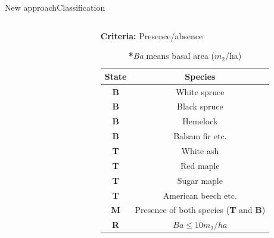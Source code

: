 \documentclass[10pt,aspectratio=149]{beamer}
\begin{document}
\begin{frame}{New approach}{Classification}

\begin{columns}[t]
	\begin{column}[t]{.40\paperwidth}
		\begin{figure}
			\small{}
		\end{figure}
	\end{column}
	\begin{column}[t]{.50\paperwidth}
	\centering \textbf{Criteria:} Presence/absence 
	\begin{table}
		\begin{tabular}{|c|c|}
		\hline
		\textbf{State} & \textbf{Species}            \\ \hline
		\textcolor{Boreal}{\textbf{B}}     & White spruce       \\
		\textcolor{Boreal}{\textbf{B}}     & Black spruce       \\
		\textcolor{Boreal}{\textbf{B}}     & Hemelock         \\
		\textcolor{Boreal}{\textbf{B}}     & Balsam fir etc.        \\ \hline
		\textcolor{Temperate}{\textbf{T}}     & White ash        \\
		\textcolor{Temperate}{\textbf{T}}     & Red maple   \\
		\textcolor{Temperate}{\textbf{T}}     & Sugar maple \\
		\textcolor{Temperate}{\textbf{T}}     & American beech etc.    \\ \hline
		\textcolor{Mixed}{\textbf{M}}     & Presence of both species (\textcolor{Temperate}{\textbf{T}} and \textcolor{Boreal}{\textbf{B}}) \\ \hline
		\textcolor{Regeneration}{\textbf{R}}     &  $Ba  \leq 10m_2/ha $  \\ \hline

		\end{tabular}
			\caption{ \textbf{*}\textit{Ba} means basal area ($m_{2}$/ha)}
		\end{table}
	\end{column}
\end{columns}

\end{frame}


\end{document}

